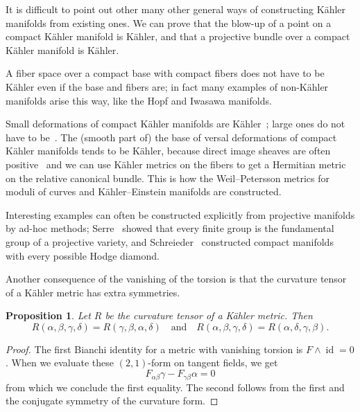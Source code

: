 \documentclass[10pt,a4paper]{article}
\newtheorem{prop}[theo]{Proposition}
\newtheorem*{proof}{Proof}
\DeclareMathOperator{\id}{id}
\begin{document}
It is difficult to point out other many other general ways of constructing K\"ahler manifolds from existing ones. We can prove that the blow-up of a point on a compact K\"ahler manifold is K\"ahler, and that a projective bundle over a compact K\"ahler manifold is K\"ahler.

A fiber space over a compact base with compact fibers does not have to be K\"ahler even if the base and fibers are; in fact many examples of non-K\"ahler manifolds arise this way, like the Hopf and Iwasawa manifolds.

Small deformations of compact K\"ahler manifolds are K\"ahler~\cite{kodaira1960deformations}; large ones do not have to be~\cite{hironaka1962example}. The (smooth part of) the base of versal deformations of compact K\"ahler manifolds tends to be K\"ahler, because direct image sheaves are often positive~\cite{berndtsson2009curvature} and we can use K\"ahler metrics on the fibers to get a Hermitian metric on the relative canonical bundle. This is how the Weil--Petersson metrics for moduli of curves and K\"ahler--Einstein manifolds are constructed.

Interesting examples can often be constructed explicitly from projective manifolds by ad-hoc methods; Serre~\cite{serre1958topologie} showed that every finite group is the fundamental group of a projective variety, and Schreieder~\cite{schreieder2015construction} constructed compact manifolds with every possible Hodge diamond.


Another consequence of the vanishing of the torsion is that the curvature tensor of a K\"ahler metric has extra symmetries.

\begin{prop}
Let $R$ be the curvature tensor of a K\"ahler metric. Then
$$
R(\alpha,\beta,\gamma,\delta) = R(\gamma,\beta,\alpha,\delta)
\quad\text{and}\quad
R(\alpha,\beta,\gamma,\delta) = R(\alpha,\delta,\gamma,\beta).
$$
\end{prop}

\begin{proof}
The first Bianchi identity for a metric with vanishing torsion is $F \wedge \id = 0$. When we evaluate these $(2,1)$-form on tangent fields, we get
$$
F_{\alpha\beta}\gamma - F_{\gamma\beta}\alpha = 0
$$
from which we conclude the first equality. The second follows from the first and the conjugate symmetry of the curvature form.
\end{proof}
\end{document}
